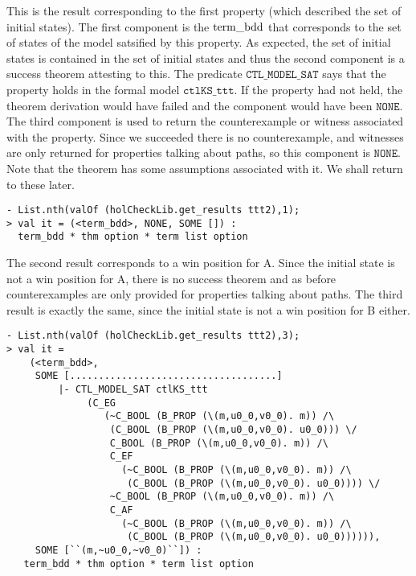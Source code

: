 This is the result corresponding to the first property (which described the set of initial states).  The first component is the \(\textup{term\_bdd}\) that corresponds to the set of states of the model satsified by this property. As expected, the set of initial states is contained in the set of initial states and thus the second component is a success theorem attesting to this. The predicate \( \mathtt{CTL\_MODEL\_SAT} \) says that the property holds in the formal model \( \mathtt{ctlKS\_ttt}\). If the property had not held, the theorem derivation would have failed and the component would have been \( \mathtt{NONE}\). The third component is used to return the counterexample or witness associated with the property. Since we succeeded there is no counterexample, and witnesses are only returned for properties talking about paths, so this component is \( \mathtt{NONE}\). Note that the theorem has some assumptions associated with it. We shall return to these later.

\begin{session}\begin{verbatim}
- List.nth(valOf (holCheckLib.get_results ttt2),1);
> val it = (<term_bdd>, NONE, SOME []) :
  term_bdd * thm option * term list option
\end{verbatim}\end{session}

The second result corresponds to a win position for A. Since the initial state is not a win position for A, there is no success theorem and as before counterexamples are only provided for properties talking about paths. The third result is exactly the same, since the initial state is not a win position for B either.

\begin{session}\begin{verbatim}
- List.nth(valOf (holCheckLib.get_results ttt2),3);
> val it =
    (<term_bdd>,
     SOME [....................................]
         |- CTL_MODEL_SAT ctlKS_ttt
              (C_EG
                 (~C_BOOL (B_PROP (\(m,u0_0,v0_0). m)) /\
                  (C_BOOL (B_PROP (\(m,u0_0,v0_0). u0_0))) \/
                  C_BOOL (B_PROP (\(m,u0_0,v0_0). m)) /\
                  C_EF
                    (~C_BOOL (B_PROP (\(m,u0_0,v0_0). m)) /\
                     (C_BOOL (B_PROP (\(m,u0_0,v0_0). u0_0)))) \/
                  ~C_BOOL (B_PROP (\(m,u0_0,v0_0). m)) /\
                  C_AF
                    (~C_BOOL (B_PROP (\(m,u0_0,v0_0). m)) /\
                     (C_BOOL (B_PROP (\(m,u0_0,v0_0). u0_0)))))),
     SOME [``(m,~u0_0,~v0_0)``]) :
   term_bdd * thm option * term list option
\end{verbatim}\end{session}

